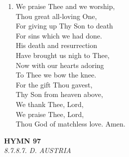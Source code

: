 \begin{enumerate}
    \item We praise Thee and we worship, \\
        Thou great all-loving One, \\
        For giving up Thy Son to death \\
        For sins which we had done. \\
        His death and resurrection \\
        Have brought us nigh to Thee, \\
        Now with our hearts adoring \\
        To Thee we bow the knee. \\
        For the gift Thou gavest, \\
        Thy Son from heaven above, \\
        We thank Thee, Lord, \\
        We praise Thee, Lord, \\
        Thou God of matchless love. Amen.

\end{enumerate}

\newpage
\begin{center}
    {\Large \textbf{HYMN 97\textdagger{}}}
    \\
    \textit{8.7.8.7. D. AUSTRIA}
\end{center}
\vspace{1em}

